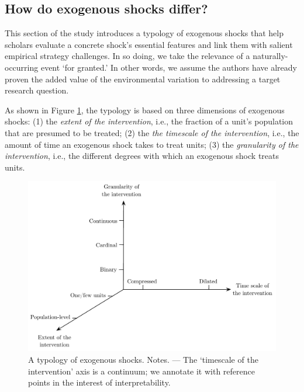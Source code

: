 \begin{refsection}
\section{How do exogenous shocks differ?}
\label{sec:how_exogenous_shocks_differ}

\noindent This section of the study introduces a typology of exogenous shocks that
help scholars evaluate a concrete shock's essential features and link them with
salient empirical strategy challenges. In so doing, we take the relevance of a
naturally-occurring event `for granted.' In other words, we assume the authors
have already proven the added value of the environmental variation to addressing
a target research question.

As shown in Figure \ref{fig:typology}, the typology is based on three dimensions
of exogenous shocks: (1) the \textit{extent of the intervention}, i.e., the 
fraction of a unit's population that are presumed to be treated; (2) the
\textit{the timescale of the intervention}, i.e., the amount of time an
exogenous shock takes to treat units; (3) the \textit{granularity of the 
intervention}, i.e., the different degrees with which an exogenous shock treats
units. 

\begin{figure}[!htbp]
    \begin{center}
      \includegraphics[width=1\textwidth]{exhibits/typology.pdf}
    \end{center}
    \caption{A typology of exogenous shocks. Notes. --- The `timescale of the 
    intervention' axis is a continuum; we annotate it with reference points
    in the interest of interpretability. }
    \label{fig:typology}
\end{figure}


\end{refsection}
